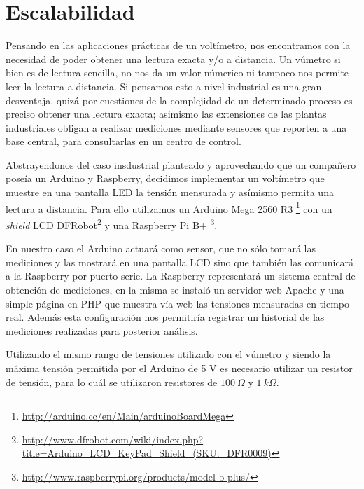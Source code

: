 \documentclass[12pt,a4paper]{article}
\begin{document}
	\newpage\null\thispagestyle{empty}\newpage
	
	\section{Escalabilidad}	\label{sec:escalabilidad}

		Pensando en las aplicaciones prácticas de un voltímetro, nos encontramos con la necesidad de poder obtener una lectura exacta y/o a distancia. Un vúmetro si bien es de lectura sencilla, no nos da un valor númerico ni tampoco nos permite leer la lectura a distancia. Si pensamos esto a nivel industrial es una gran desventaja, quizá por cuestiones de la complejidad de un determinado proceso es preciso obtener una lectura exacta; asimismo las extensiones de las plantas industriales obligan a realizar mediciones mediante sensores que reporten a una base central, para consultarlas en un centro de control.

		Abstrayendonos del caso insdustrial planteado y aprovechando que un compañero poseía un Arduino y Raspberry, decidimos implementar un voltímetro que muestre en una pantalla LED la tensión mensurada y asímismo permita una lectura a distancia. Para ello utilizamos un Arduino Mega 2560 R3 \footnote{\url{http://arduino.cc/en/Main/arduinoBoardMega} } con un \textit{shield} LCD DFRobot\footnote{\url{http://www.dfrobot.com/wiki/index.php?title=Arduino_LCD_KeyPad_Shield_(SKU:_DFR0009)} } y una Raspberry Pi B+ \footnote{\url{http://www.raspberrypi.org/products/model-b-plus/} }.

		En nuestro caso el Arduino actuará como sensor, que no sólo tomará las mediciones y las mostrará en una pantalla LCD sino que también las comunicará a la Raspberry por puerto serie. La Raspberry representará un sistema central de obtención de mediciones, en la misma se instaló un servidor web Apache y una simple página en PHP que muestra vía web las tensiones mensuradas en tiempo real. Además esta configuración nos permitiría registrar un historial de las mediciones realizadas para posterior análisis.

		Utilizando el mismo rango de tensiones utilizado con el vúmetro y siendo la máxima tensión permitida por el Arduino de 5 V es necesario utilizar un resistor de tensión, para lo cuál se utilizaron resistores de $100 \: \Omega$ y $1 \: k\Omega$. 
\end{document}
